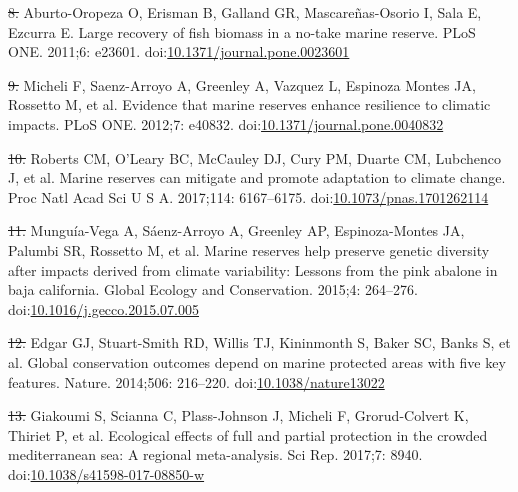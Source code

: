 \documentclass[12pt,]{article}
\providecommand{\DIFaddtex}[1]{{\protect\color{blue}\uwave{#1}}} %
\providecommand{\DIFdeltex}[1]{{\protect\color{red}\sout{#1}}}                      %
\providecommand{\DIFaddbegin}{} %
\providecommand{\DIFaddend}{} %
\providecommand{\DIFdelbegin}{} %
\providecommand{\DIFdelend}{} %
\providecommand{\DIFadd}[1]{\texorpdfstring{\DIFaddtex{#1}}{#1}} %
\providecommand{\DIFdel}[1]{\texorpdfstring{\DIFdeltex{#1}}{}} %
\newcommand{\DIFscaledelfig}{0.5}
\newlength{\DIFdelgraphicswidth} %
\newlength{\DIFdelgraphicsheight} %
\newcommand{\DIFaddincludegraphics}[2][]{{\color{blue}\fbox{\DIFOincludegraphics[#1]{#2}}}} %
\newcommand{\DIFdelincludegraphics}[2][]{%
\sbox{\DIFdelgraphicsbox}{\DIFOincludegraphics[#1]{#2}}%
\settoboxwidth{\DIFdelgraphicswidth}{\DIFdelgraphicsbox} %
\settoboxtotalheight{\DIFdelgraphicsheight}{\DIFdelgraphicsbox} %
\scalebox{\DIFscaledelfig}{%
\parbox[b]{\DIFdelgraphicswidth}{\usebox{\DIFdelgraphicsbox}\\[-\baselineskip] \rule{\DIFdelgraphicswidth}{0em}}\llap{\resizebox{\DIFdelgraphicswidth}{\DIFdelgraphicsheight}{%
\setlength{\unitlength}{\DIFdelgraphicswidth}%
\begin{picture}(1,1)%
\thicklines\linethickness{2pt} %
{\color[rgb]{1,0,0}\put(0,0){\framebox(1,1){}}}%
{\color[rgb]{1,0,0}\put(0,0){\line( 1,1){1}}}%
{\color[rgb]{1,0,0}\put(0,1){\line(1,-1){1}}}%
\end{picture}%
}\hspace*{3pt}}} %
} %
\DeclareRobustCommand{\DIFaddbegin}{\DIFOaddbegin \let\includegraphics\DIFaddincludegraphics} %
\DeclareRobustCommand{\DIFaddend}{\DIFOaddend \let\includegraphics\DIFOincludegraphics} %
\DeclareRobustCommand{\DIFdelbegin}{\DIFOdelbegin \let\includegraphics\DIFdelincludegraphics} %
\DeclareRobustCommand{\DIFdelend}{\DIFOaddend \let\includegraphics\DIFOincludegraphics} %
\begin{document}
\DIFdelend \hypertarget{ref-aburtooropeza_2011-ya}{}
\DIFdelbegin \DIFdel{8. }\DIFdelend \DIFaddbegin \DIFadd{7. }\DIFaddend Aburto-Oropeza O, Erisman B, Galland GR, Mascareñas-Osorio I, Sala E,
Ezcurra E. Large recovery of fish biomass in a no-take marine reserve.
PLoS ONE. 2011;6: e23601.
doi:\href{https://doi.org/10.1371/journal.pone.0023601}{10.1371/journal.pone.0023601}

\hypertarget{ref-micheli_2012-EU}{}
\DIFdelbegin \DIFdel{9. }\DIFdelend \DIFaddbegin \DIFadd{8. }\DIFaddend Micheli F, Saenz-Arroyo A, Greenley A, Vazquez L, Espinoza Montes JA,
Rossetto M, et al. Evidence that marine reserves enhance resilience to
climatic impacts. PLoS ONE. 2012;7: e40832.
doi:\href{https://doi.org/10.1371/journal.pone.0040832}{10.1371/journal.pone.0040832}

\hypertarget{ref-roberts_2017-J9}{}
\DIFdelbegin \DIFdel{10. }\DIFdelend \DIFaddbegin \DIFadd{9. }\DIFaddend Roberts CM, O'Leary BC, McCauley DJ, Cury PM, Duarte CM, Lubchenco J,
et al. Marine reserves can mitigate and promote adaptation to climate
change. Proc Natl Acad Sci U S A. 2017;114: 6167--6175.
doi:\href{https://doi.org/10.1073/pnas.1701262114}{10.1073/pnas.1701262114}

\hypertarget{ref-munguavega_2015-yg}{}
\DIFdelbegin \DIFdel{11. }\DIFdelend \DIFaddbegin \DIFadd{10. }\DIFaddend Munguía-Vega A, Sáenz-Arroyo A, Greenley AP, Espinoza-Montes JA,
Palumbi SR, Rossetto M, et al. Marine reserves help preserve genetic
diversity after impacts derived from climate variability: Lessons from
the pink abalone in baja california. Global Ecology and Conservation.
2015;4: 264--276.
doi:\href{https://doi.org/10.1016/j.gecco.2015.07.005}{10.1016/j.gecco.2015.07.005}

\hypertarget{ref-edgar_2014-UO}{}
\DIFdelbegin \DIFdel{12. }\DIFdelend \DIFaddbegin \DIFadd{11. }\DIFaddend Edgar GJ, Stuart-Smith RD, Willis TJ, Kininmonth S, Baker SC, Banks
S, et al. Global conservation outcomes depend on marine protected areas
with five key features. Nature. 2014;506: 216--220.
doi:\href{https://doi.org/10.1038/nature13022}{10.1038/nature13022}

\hypertarget{ref-giakoumi_2017-V2}{}
\DIFdelbegin \DIFdel{13. }\DIFdelend \DIFaddbegin \DIFadd{12. }\DIFaddend Giakoumi S, Scianna C, Plass-Johnson J, Micheli F, Grorud-Colvert K,
Thiriet P, et al. Ecological effects of full and partial protection in
the crowded mediterranean sea: A regional meta-analysis. Sci Rep.
2017;7: 8940.
doi:\href{https://doi.org/10.1038/s41598-017-08850-w}{10.1038/s41598-017-08850-w}
\end{document}
